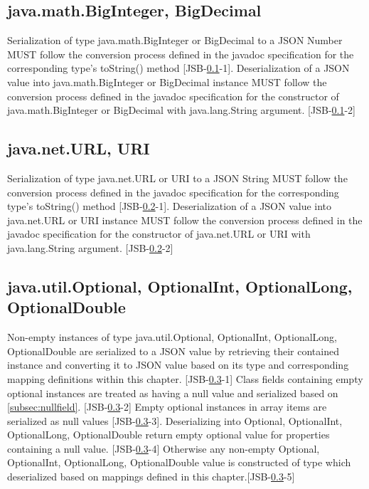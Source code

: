 \subsection{java.math.BigInteger, BigDecimal}
\label{subsec:bignumber}
Serialization of type java.math.BigInteger or BigDecimal to a JSON Number 
MUST follow the conversion process defined in the javadoc specification for the corresponding type's toString() method [JSB-\ref{subsec:bignumber}-1]. 
Deserialization of a JSON value into java.math.BigInteger or BigDecimal instance 
MUST follow the conversion process defined in the javadoc specification for the constructor of java.math.BigInteger or BigDecimal with java.lang.String argument. [JSB-\ref{subsec:bignumber}-2]

\subsection{java.net.URL, URI}
\label{subsec:url}
Serialization of type java.net.URL or URI to a JSON String 
MUST follow the conversion process defined in the javadoc specification for the corresponding type's toString() method [JSB-\ref{subsec:url}-1]. 
Deserialization of a JSON value into java.net.URL or URI instance 
MUST follow the conversion process defined in the javadoc specification for the constructor of java.net.URL or URI with java.lang.String argument. [JSB-\ref{subsec:url}-2]

\subsection{java.util.Optional, OptionalInt, OptionalLong, OptionalDouble}
\label{subsec:optional}
Non-empty instances of type java.util.Optional, OptionalInt, OptionalLong, OptionalDouble are serialized to a JSON value by retrieving their contained instance and converting it to JSON value based on its type and corresponding mapping definitions within this chapter. [JSB-\ref{subsec:optional}-1] 
Class fields containing empty optional instances are treated as having a null value and serialized based on \ref{subsec:nullfield}. [JSB-\ref{subsec:optional}-2] 
Empty optional instances in array items are serialized as null values [JSB-\ref{subsec:optional}-3]. 
Deserializing into Optional, OptionalInt, OptionalLong, OptionalDouble return empty optional value for properties containing a null value. [JSB-\ref{subsec:optional}-4] 
Otherwise any non-empty Optional, OptionalInt, OptionalLong, OptionalDouble value is constructed of type which deserialized based on mappings defined in this chapter.[JSB-\ref{subsec:optional}-5]

